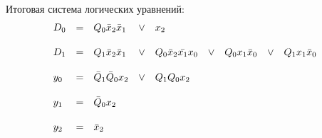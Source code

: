 Итоговая система логических уравнений:
\[
    \begin{array}{l c l c l c l c l}
        D_0 &=& Q_0\Bar{x}_2\Bar{x}_1 &\lor& x_2 &&&& \\[3ex]
        D_1 &=& Q_1\Bar{x}_2\Bar{x}_1 &\lor& Q_0\Bar{x}_2\Bar{x_1}x_0 &\lor&
                Q_0x_1\Bar{x}_0 &\lor& Q_1x_1\Bar{x}_0 \\[3ex]
        y_0 &=& \Bar{Q}_1\Bar{Q}_0x_2 &\lor& Q_1Q_0x_2 &&&&\\[3ex]
        y_1 &=& \Bar{Q}_0x_2 &&&&&& \\[3ex]
        y_2 &=& \Bar{x}_2    &&&&&&
    \end{array}
\]

